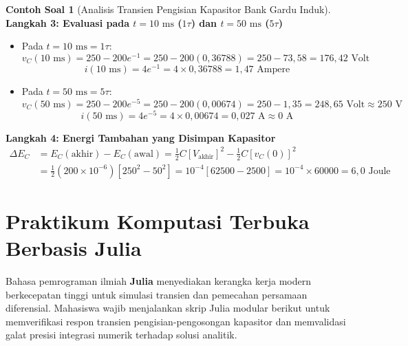 \documentclass[11pt,a4paper]{article}
\theoremstyle{definition}
\newtheorem{example}{Contoh Soal}[section]
\begin{document}
\begin{example}[Analisis Transien Pengisian Kapasitor Bank Gardu Induk]
\textbf{Langkah 3: Evaluasi pada $t = 10\text{ ms}$ ($1\tau$) dan $t = 50\text{ ms}$ ($5\tau$)}
\begin{itemize}
    \item Pada $t = 10\text{ ms} = 1\tau$:
    \begin{equation}
        v_C(10\text{ ms}) = 250 - 200 e^{-1} = 250 - 200(0{,}36788) = 250 - 73{,}58 = 176{,}42\text{ Volt}
    \end{equation}
    \begin{equation}
        i(10\text{ ms}) = 4 e^{-1} = 4 \times 0{,}36788 = 1{,}47\text{ Ampere}
    \end{equation}
    \item Pada $t = 50\text{ ms} = 5\tau$:
    \begin{equation}
        v_C(50\text{ ms}) = 250 - 200 e^{-5} = 250 - 200(0{,}00674) = 250 - 1{,}35 = 248{,}65\text{ Volt} \approx 250\text{ V}
    \end{equation}
    \begin{equation}
        i(50\text{ ms}) = 4 e^{-5} = 4 \times 0{,}00674 = 0{,}027\text{ A} \approx 0\text{ A}
    \end{equation}
\end{itemize}

\textbf{Langkah 4: Energi Tambahan yang Disimpan Kapasitor}
\begin{align}
    \Delta E_C &= E_C(\text{akhir}) - E_C(\text{awal}) = \frac{1}{2} C [V_{\text{akhir}}]^2 - \frac{1}{2} C [v_C(0)]^2 \nonumber \\
    &= \frac{1}{2} (200 \times 10^{-6}) \left[ 250^2 - 50^2 \right] = 10^{-4} \left[ 62500 - 2500 \right] = 10^{-4} \times 60000 = 6{,}0\text{ Joule}
\end{align}
\end{example}

\section{Praktikum Komputasi Terbuka Berbasis Julia}

Bahasa pemrograman ilmiah \textbf{Julia} menyediakan kerangka kerja modern berkecepatan tinggi untuk simulasi transien dan pemecahan persamaan diferensial. Mahasiswa wajib menjalankan skrip Julia modular berikut untuk memverifikasi respon transien pengisian-pengosongan kapasitor dan memvalidasi galat presisi integrasi numerik terhadap solusi analitik.
\end{document}
